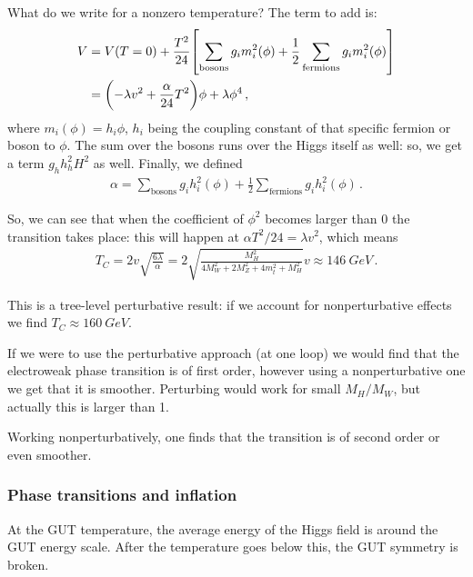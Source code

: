 \documentclass[main.tex]{subfiles}
\begin{document}
What do we write for a nonzero temperature? The term to add is: 
%
\begin{align}
V &= V(T = 0) + \frac{T^2}{24} \qty[ \sum _{\text{bosons}} g_i m_i^2 (\phi ) + \frac{1}{2} \sum _{\text{fermions}} g_i m_i^2 (\phi )]  \\
&= \qty(- \lambda v^2 + \frac{\alpha}{24} T^2) \phi  + \lambda \phi^{4}
\,,
\end{align}
%
where \(m_i (\phi ) = h_i \phi \), \(h_i\) being the coupling constant of that specific fermion or boson to \(\phi \). 
The sum over the bosons runs over the Higgs itself as well: so, we get a term \(g_h h_h^2 H^2\) as well. 
Finally, we defined 
%
\begin{align}
\alpha = \sum _{\text{bosons}} g_i h_i^2 (\phi ) + \frac{1}{2} \sum _{\text{fermions}} g_i h_i^2 (\phi )
\,.
\end{align}

So, we can see that when the coefficient of \(\phi^2\) becomes larger than \(0\) the transition takes place: this will happen at \(\alpha T^2 / 24 = \lambda v^2\), which means 
%
\begin{align}
T_C = 2 v \sqrt{ \frac{6\lambda}{\alpha }} 
= 2 \sqrt{ \frac{M_H^2}{4 M_W^2 + 2 M_Z^2 + 4 m_t^2 + M_H^2}} v 
\approx \SI{146}{GeV}
\,.
\end{align}

This is a tree-level perturbative result: if we account for nonperturbative effects we find \(T_C \approx \SI{160}{GeV}\). 

If we were to use the perturbative approach (at one loop) we would find that the electroweak phase transition is of first order, however using a nonperturbative one we get that it is smoother. 
Perturbing would work for small \( M_H / M_W \), but actually this is larger than 1. 

Working nonperturbatively, one finds that the transition is of second order or even smoother. 

\subsubsection{Phase transitions and inflation}


At the GUT temperature, the average energy of the Higgs field is around the GUT energy scale.
After the temperature goes below this, the GUT symmetry is broken. 
\end{document}
